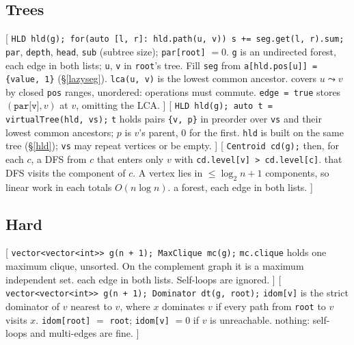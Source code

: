 \subsection{Trees}
[
	 \texttt{HLD hld(g); for(auto [l, r]: hld.path(u, v)) s += seg.get(l, r).sum;}
	 \texttt{par}, \texttt{depth}, \texttt{head}, \texttt{sub} (subtree size); \texttt{par[root]} $= 0$.
	 \texttt{g} is an undirected forest, each edge in both lists; \texttt{u}, \texttt{v} in \texttt{root}'s tree. Fill \texttt{seg} from \texttt{a[hld.pos[u]] = \{value, 1\}} (\S\ref{lazyseg}).
	 \texttt{lca(u, v)} is the lowest common ancestor.
	 covers $u \leadsto v$ by closed \texttt{pos} ranges, unordered: operations must commute. \texttt{edge = true} stores $(\texttt{par[v]}, v)$ at $v$, omitting the LCA.
]\label{hld}
[
	 \texttt{HLD hld(g); auto t = virtualTree(hld, vs);}
	 \texttt{t} holds pairs \texttt{\{v, p\}} in preorder over \texttt{vs} and their lowest common ancestors; $p$ is $v$'s parent, 0 for the first.
	 \texttt{hld} is built on the same tree (\S\ref{hld}); \texttt{vs} may repeat vertices or be empty.
]\label{virtualtree}
[
	 \texttt{Centroid cd(g);} then, for each $c$, a DFS from $c$ that enters only $v$ with \texttt{cd.level[v] > cd.level[c]}.
	 that DFS visits the component of $c$. A vertex lies in $\le \log_2 n + 1$ components, so linear work in each totals $O(n \log n)$.
	 a forest, each edge in both lists.
]\label{centroid}

\subsection{Hard}
[
	 \texttt{vector<vector<int>> g(n + 1); MaxClique mc(g);}
	 \texttt{mc.clique} holds one maximum clique, unsorted. On the complement graph it is a maximum independent set.
	 each edge in both lists. Self-loops are ignored.
]\label{maxclique}
[
	 \texttt{vector<vector<int>> g(n + 1); Dominator dt(g, root);}
	 \texttt{idom[v]} is the strict dominator of $v$ nearest to $v$, where $x$ dominates $v$ if every path from \texttt{root} to $v$ visits $x$. \texttt{idom[root]} $=$ \texttt{root}; \texttt{idom[v]} $= 0$ if $v$ is unreachable.
	 nothing: self-loops and multi-edges are fine.
]\label{dominator}
